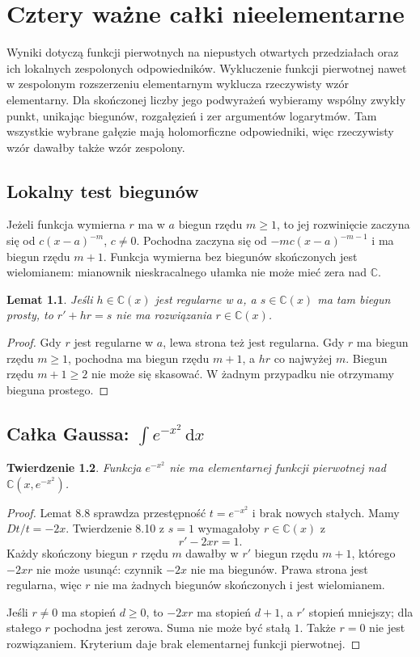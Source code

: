 \documentclass[11pt,a4paper,oneside]{book}
\numberwithin{equation}{section}
\theoremstyle{plain}
\newtheorem{twierdzenie}{Twierdzenie}[chapter]
\newtheorem{lemat}[twierdzenie]{Lemat}
\theoremstyle{definition}
\theoremstyle{remark}
\newcommand{\C}{\mathbb{C}}
\newcommand{\dd}{\,\mathrm{d}}
\begin{document}
\chapter{Cztery ważne całki nieelementarne}

Wyniki dotyczą funkcji pierwotnych na niepustych otwartych przedziałach oraz ich lokalnych zespolonych odpowiedników. Wykluczenie funkcji pierwotnej nawet w zespolonym rozszerzeniu elementarnym wyklucza rzeczywisty wzór elementarny. Dla skończonej liczby jego podwyrażeń wybieramy wspólny zwykły punkt, unikając biegunów, rozgałęzień i zer argumentów logarytmów. Tam wszystkie wybrane gałęzie mają holomorficzne odpowiedniki, więc rzeczywisty wzór dawałby także wzór zespolony.

\section{Lokalny test biegunów}

Jeżeli funkcja wymierna $r$ ma w $a$ biegun rzędu $m\ge1$, to jej rozwinięcie zaczyna się od $c(x-a)^{-m}$, $c\ne0$. Pochodna zaczyna się od $-mc(x-a)^{-m-1}$ i ma biegun rzędu $m+1$. Funkcja wymierna bez biegunów skończonych jest wielomianem: mianownik nieskracalnego ułamka nie może mieć zera nad $\C$.

\begin{lemat}
Jeśli $h\in\C(x)$ jest regularne w $a$, a $s\in\C(x)$ ma tam biegun prosty, to $r'+hr=s$ nie ma rozwiązania $r\in\C(x)$.
\end{lemat}
\begin{proof}
Gdy $r$ jest regularne w $a$, lewa strona też jest regularna. Gdy $r$ ma biegun rzędu $m\ge1$, pochodna ma biegun rzędu $m+1$, a $hr$ co najwyżej $m$. Biegun rzędu $m+1\ge2$ nie może się skasować. W żadnym przypadku nie otrzymamy bieguna prostego.
\end{proof}

\section{Całka Gaussa: $\int e^{-x^2}\dd x$}

\begin{twierdzenie}
Funkcja $e^{-x^2}$ nie ma elementarnej funkcji pierwotnej nad $\C(x,e^{-x^2})$.
\end{twierdzenie}
\begin{proof}
Lemat 8.8 sprawdza przestępność $t=e^{-x^2}$ i brak nowych stałych. Mamy $Dt/t=-2x$. Twierdzenie 8.10 z $s=1$ wymagałoby $r\in\C(x)$ z
\[
r'-2xr=1.
\]
Każdy skończony biegun $r$ rzędu $m$ dawałby w $r'$ biegun rzędu $m+1$, którego $-2xr$ nie może usunąć: czynnik $-2x$ nie ma biegunów. Prawa strona jest regularna, więc $r$ nie ma żadnych biegunów skończonych i jest wielomianem.

Jeśli $r\ne0$ ma stopień $d\ge0$, to $-2xr$ ma stopień $d+1$, a $r'$ stopień mniejszy; dla stałego $r$ pochodna jest zerowa. Suma nie może być stałą $1$. Także $r=0$ nie jest rozwiązaniem. Kryterium daje brak elementarnej funkcji pierwotnej.
\end{proof}
\end{document}
